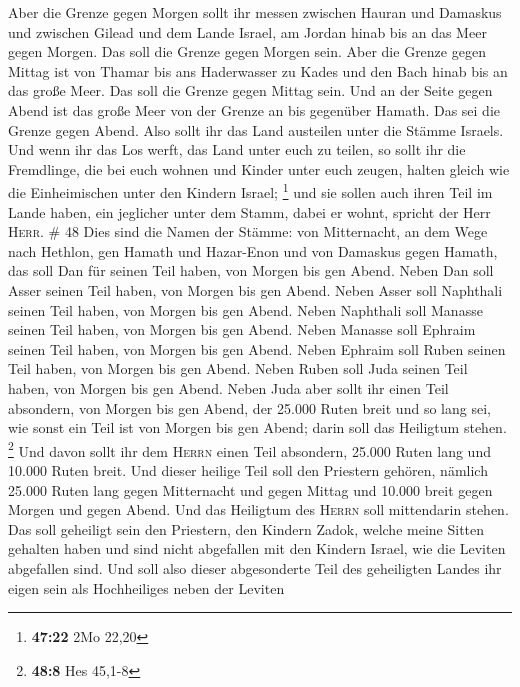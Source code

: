  Aber die Grenze gegen Morgen sollt ihr messen zwischen
Hauran und Damaskus und zwischen Gilead und dem Lande Israel, am Jordan
hinab bis an das Meer gegen Morgen. Das soll die Grenze gegen Morgen
sein.  Aber die Grenze gegen Mittag ist von Thamar bis
ans Haderwasser zu Kades und den Bach hinab bis an das große Meer. Das
soll die Grenze gegen Mittag sein.  Und an der Seite
gegen Abend ist das große Meer von der Grenze an bis gegenüber Hamath.
Das sei die Grenze gegen Abend.  Also sollt ihr das Land
austeilen unter die Stämme Israels.  Und wenn ihr das Los
werft, das Land unter euch zu teilen, so sollt ihr die Fremdlinge, die
bei euch wohnen und Kinder unter euch zeugen, halten gleich wie die
Einheimischen unter den Kindern Israel; \footnote{\textbf{47:22} 2Mo
  22,20}  und sie sollen auch ihren Teil im Lande haben,
ein jeglicher unter dem Stamm, dabei er wohnt, spricht der Herr
\textsc{Herr}. \# 48  Dies sind die Namen der Stämme: von
Mitternacht, an dem Wege nach Hethlon, gen Hamath und Hazar-Enon und von
Damaskus gegen Hamath, das soll Dan für seinen Teil haben, von Morgen
bis gen Abend.  Neben Dan soll Asser seinen Teil haben,
von Morgen bis gen Abend.  Neben Asser soll Naphthali
seinen Teil haben, von Morgen bis gen Abend.  Neben
Naphthali soll Manasse seinen Teil haben, von Morgen bis gen Abend.
 Neben Manasse soll Ephraim seinen Teil haben, von Morgen
bis gen Abend.  Neben Ephraim soll Ruben seinen Teil
haben, von Morgen bis gen Abend.  Neben Ruben soll Juda
seinen Teil haben, von Morgen bis gen Abend.  Neben Juda
aber sollt ihr einen Teil absondern, von Morgen bis gen Abend, der
25.000 Ruten breit und so lang sei, wie sonst ein Teil ist von Morgen
bis gen Abend; darin soll das Heiligtum stehen. \footnote{\textbf{48:8}
  Hes 45,1-8}  Und davon sollt ihr dem \textsc{Herrn}
einen Teil absondern, 25.000 Ruten lang und 10.000 Ruten breit.
 Und dieser heilige Teil soll den Priestern gehören,
nämlich 25.000 Ruten lang gegen Mitternacht und gegen Mittag und 10.000
breit gegen Morgen und gegen Abend. Und das Heiligtum des \textsc{Herrn}
soll mittendarin stehen.  Das soll geheiligt sein den
Priestern, den Kindern Zadok, welche meine Sitten gehalten haben und
sind nicht abgefallen mit den Kindern Israel, wie die Leviten abgefallen
sind.  Und soll also dieser abgesonderte Teil des
geheiligten Landes ihr eigen sein als Hochheiliges neben der Leviten
